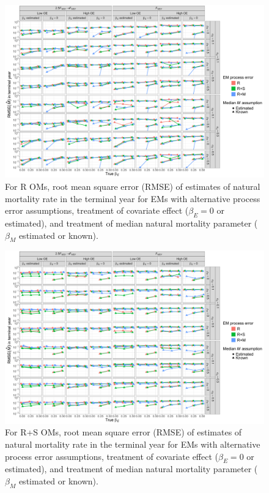\documentclass[
  12pt,
]{article}
\begin{document}
\begin{landscape}
\begin{figure}
\begin{center}
\includegraphics[height = \textheight]{terminal_year_M_rmse_Rom}
\end{center}
\caption{For R OMs, root mean square error (RMSE) of estimates of natural mortality rate in the terminal year for EMs with alternative process error assumptions, treatment of covariate effect ($\beta_E = 0$ or estimated), and treatment of median natural mortality parameter ($\beta_M$ estimated or known).}\label{terminal_M_rmse_Rom}
\end{figure}
\end{landscape}

\begin{landscape}
\begin{figure}
\begin{center}
\includegraphics[height = \textheight]{terminal_year_M_rmse_RSom}
\end{center}
\caption{For R+S OMs, root mean square error (RMSE) of estimates of natural mortality rate in the terminal year for EMs with alternative process error assumptions, treatment of covariate effect ($\beta_E = 0$ or estimated), and treatment of median natural mortality parameter ($\beta_M$ estimated or known).}\label{terminal_M_rmse_RSom}
\end{figure}
\end{landscape}
\end{document}
